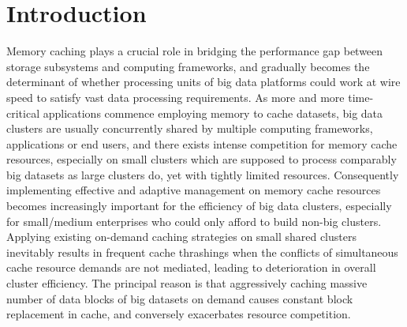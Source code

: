 \section{Introduction}\label{sec:Introduction}


Memory caching plays a crucial role in bridging the performance gap between storage subsystems and computing frameworks, and gradually becomes the determinant of whether processing units of big data platforms could work at wire speed to satisfy vast data processing requirements.
As more and more time-critical applications commence employing memory to cache datasets, big data clusters are usually concurrently shared by multiple computing frameworks, applications or end users, and  there exists intense competition for memory cache resources, especially on small clusters which are supposed to process comparably big datasets as large clusters do, yet with tightly limited resources. Consequently implementing effective and adaptive management on memory cache resources becomes increasingly important for the efficiency of big data clusters, especially for small/medium enterprises who could only afford to build non-big clusters. Applying existing on-demand caching strategies on small shared clusters inevitably results in frequent cache thrashings when the conflicts of simultaneous cache resource demands are not mediated, leading to deterioration in overall cluster efficiency.
The principal reason is that aggressively caching massive number of data blocks of big datasets on demand causes constant block replacement in cache, and conversely exacerbates resource competition.



